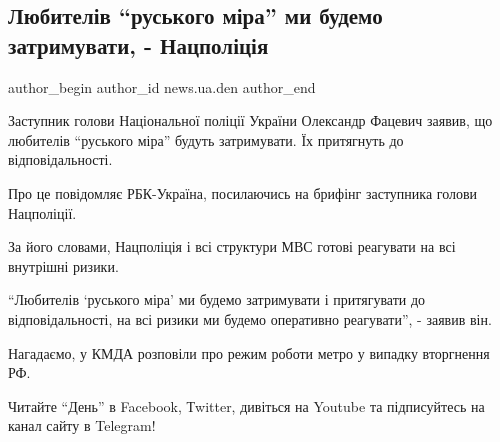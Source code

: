  
 
 
 
 
 
\subsection{Любителів \enquote{руського міра} ми будемо затримувати, - Нацполіція}
\label{sec:17_02_2022.stz.news.ua.den.1.rusmir}
 
\ifcmt
 author_begin
   author_id news.ua.den
 author_end
\fi

Заступник голови Національної поліції України Олександр Фацевич заявив, що
любителів \enquote{руського міра} будуть затримувати. Їх притягнуть до
відповідальності.

Про це повідомляє РБК-Україна, посилаючись на брифінг заступника голови
Нацполіції.

За його словами, Нацполіція і всі структури МВС готові реагувати на всі
внутрішні ризики.

\enquote{Любителів \enquote{руського міра} ми будемо затримувати і притягувати
до відповідальності, на всі ризики ми будемо оперативно реагувати}, - заявив
він.

Нагадаємо, у КМДА розповіли про режим роботи метро у випадку вторгнення РФ.

Читайте \enquote{День} в Facebook, Тwitter, дивіться на Youtube та підписуйтесь
на канал сайту в Telegram!
